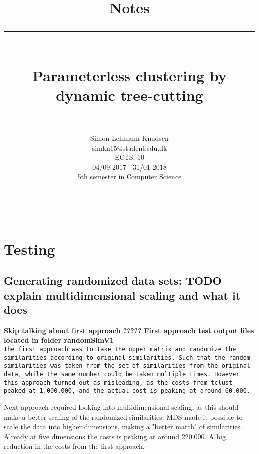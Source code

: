 \documentclass[a4paper,10pt]{article}
\title{ Notes \\\rule{5.5cm}{0.5mm} \\ Parameterless clustering by dynamic tree-cutting \\\rule{10cm}{0.5mm}}
\author{Simon Lehmann Knudsen \\
	simkn15@student.sdu.dk \\
	ECTS: 10 \\
	04/09-2017 - 31/01-2018 \\
	5th semester in Computer Science
\\\rule{5.5cm}{0.5mm}\\}
\begin{document}
\maketitle

\tableofcontents

\newpage
\section{Testing}

\subsection{Generating randomized data sets: TODO explain multidimensional scaling and what it does}
\textbf{Skip talking about first approach ?????}
\textbf{First approach test output files located in folder randomSimV1}\\
\texttt{The first approach was to take the upper matrix and randomize the similarities according to original similarities. Such that the random similarities was taken from the set of similarities from the original data, while the same number could be taken multiple times. 
However this approach turned out as misleading, as the costs from tclust peaked at 1.000.000, and the actual cost is peaking at around 60.000.}

Next approach required looking into multidimensional scaling, as this should make a better scaling of the randomized similarities. MDS made it possible to scale the data into higher dimensions, making a "better match" of similarities. Already at five dimensions the costs is peaking at around 220.000. A big reduction in the costs from the first approach.

\end{document}
